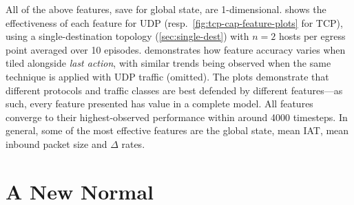 \documentclass[10pt, times, comsoc]{IEEEtran}
\begin{document}
All of the above features, save for global state, are 1-dimensional.
 shows the effectiveness of each feature for UDP (resp.\ \cref{fig:tcp-cap-feature-plots} for TCP), using a single-destination topology (\cref{sec:single-dest}) with $n=2$ hosts per egress point averaged over 10 episodes.
 demonstrates how feature accuracy varies when tiled alongside \emph{last action}, with similar trends being observed when the same technique is applied with UDP traffic (omitted).
The plots demonstrate that different protocols and traffic classes are best defended by different features---as such, every feature presented has value in a complete model.
All features converge to their highest-observed performance within around \num{4000} timesteps.
In general, some of the most effective features are the global state, mean IAT, mean inbound packet size and $\Delta$ rates.

\section{A New Normal}\label{sec:a-new-normal}

%
\end{document}
